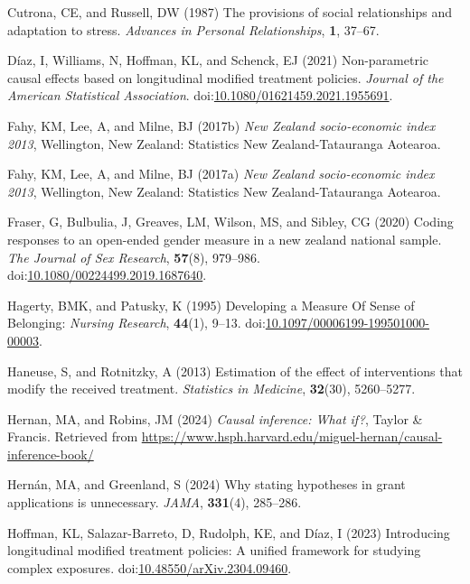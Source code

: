 \documentclass[
  single column]{article}
\newlength{\cslhangindent}
\newenvironment{CSLReferences}[2] %
 {\begin{list}{}{%
  \setlength{\itemindent}{0pt}
  \setlength{\leftmargin}{0pt}
  \setlength{\parsep}{0pt}
  \ifodd #1
   \setlength{\leftmargin}{\cslhangindent}
   \setlength{\itemindent}{-1\cslhangindent}
  \fi
  \setlength{\itemsep}{#2\baselineskip}}}
 {\end{list}}
\begin{document}
\begin{CSLReferences}{1}{0}
Cutrona, CE, and Russell, DW (1987) The provisions of social
relationships and adaptation to stress. \emph{Advances in Personal
Relationships}, \textbf{1}, 37--67.

Díaz, I, Williams, N, Hoffman, KL, and Schenck, EJ (2021) Non-parametric
causal effects based on longitudinal modified treatment policies.
\emph{Journal of the American Statistical Association}.
doi:\href{https://doi.org/10.1080/01621459.2021.1955691}{10.1080/01621459.2021.1955691}.

Fahy, KM, Lee, A, and Milne, BJ (2017b) \emph{New Zealand socio-economic
index 2013}, Wellington, New Zealand: Statistics New Zealand-Tatauranga
Aotearoa.

Fahy, KM, Lee, A, and Milne, BJ (2017a) \emph{New Zealand socio-economic
index 2013}, Wellington, New Zealand: Statistics New Zealand-Tatauranga
Aotearoa.

Fraser, G, Bulbulia, J, Greaves, LM, Wilson, MS, and Sibley, CG (2020)
Coding responses to an open-ended gender measure in a new zealand
national sample. \emph{The Journal of Sex Research}, \textbf{57}(8),
979--986.
doi:\href{https://doi.org/10.1080/00224499.2019.1687640}{10.1080/00224499.2019.1687640}.

Hagerty, BMK, and Patusky, K (1995) Developing a Measure Of Sense of
Belonging: \emph{Nursing Research}, \textbf{44}(1), 9--13.
doi:\href{https://doi.org/10.1097/00006199-199501000-00003}{10.1097/00006199-199501000-00003}.

Haneuse, S, and Rotnitzky, A (2013) Estimation of the effect of
interventions that modify the received treatment. \emph{Statistics in
Medicine}, \textbf{32}(30), 5260--5277.

Hernan, MA, and Robins, JM (2024) \emph{Causal inference: What if?},
Taylor \& Francis. Retrieved from
\url{https://www.hsph.harvard.edu/miguel-hernan/causal-inference-book/}

Hernán, MA, and Greenland, S (2024) Why stating hypotheses in grant
applications is unnecessary. \emph{JAMA}, \textbf{331}(4), 285--286.

Hoffman, KL, Salazar-Barreto, D, Rudolph, KE, and Díaz, I (2023)
Introducing longitudinal modified treatment policies: A unified
framework for studying complex exposures.
doi:\href{https://doi.org/10.48550/arXiv.2304.09460}{10.48550/arXiv.2304.09460}.


\end{CSLReferences}
\end{document}
